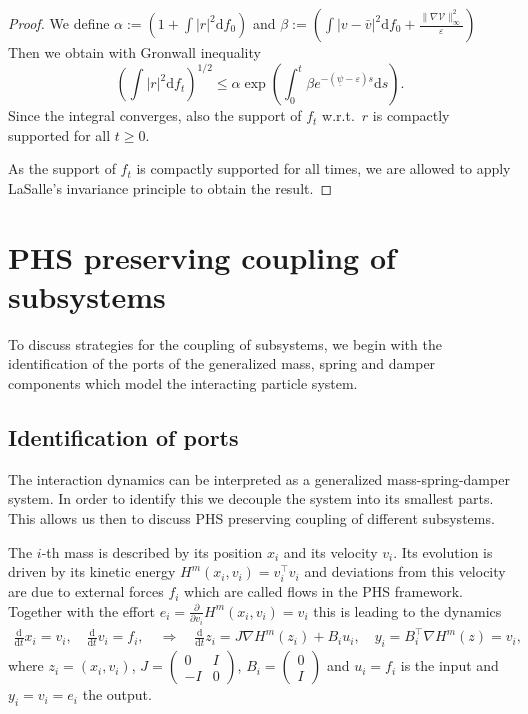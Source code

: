 \documentclass[11pt]{article}
\newcommand{\dd}[0]{\mathrm d}
\newcommand{\V}[0]{\mathcal V}
\begin{document}
\begin{bibunit}[abbrv]
\begin{proof}
We define $\alpha := (1+\int |r|^2 \dd f_0)$ and $\beta:=\left(\int |v-\bar v|^2 \dd f_0+\frac{\| \nabla \V \|_\infty^2}{\varepsilon} \right)$
Then we obtain with Gronwall inequality
\[
\left(\int |r|^2 \dd f_t\right)^{1/2} \le \alpha \exp( \int_0^t \beta e^{-(\underline{\psi} - \varepsilon)s }\dd s ).
\]
Since the integral converges, also the support of $f_t$ w.r.t.~$r$ is compactly supported for all $t\ge 0$. 

As the support of $f_t$ is compactly supported for all times, we are allowed to apply LaSalle's invariance principle to obtain the result.
\end{proof}


\section{PHS preserving coupling of subsystems}\label{sec:coupling}
To discuss strategies for the coupling of subsystems, we begin with the identification of the ports of the generalized mass, spring and damper components which model the interacting particle system. 


\subsection{Identification of ports}
The interaction dynamics can be interpreted as a generalized mass-spring-damper system. In order to identify this we decouple the system into its smallest parts. This allows us then to discuss PHS preserving coupling of different subsystems.

The $i$-th mass is described by its position $x_i$ and its velocity $v_i$. Its evolution is driven by its kinetic energy $H^m(x_i,v_i) = v_i^\top v_i$ and deviations from this velocity are due to external forces $f_i$ which are called flows in the PHS framework. Together with the effort $e_i = \frac{\partial}{\partial v_i} H^m(x_i,v_i) = v_i$ this is leading to the dynamics
\begin{align*}
\frac{\dd}{\dd t} x_i = v_i, \quad \frac{\dd}{\dd t} v_i =  f_i, \quad \Rightarrow \quad \frac{\dd}{\dd t} z_i = J \nabla H^m(z_i) + B_i u_i, \quad y_i = B_i^\top \nabla H^m(z) =  v_i,
\end{align*}
where $z_i=(x_i,v_i)$, $J = \left(\begin{smallmatrix}0 & I \\ -I & 0\end{smallmatrix}\right)$,  $B_i = \left(\begin{smallmatrix}0 \\ I\end{smallmatrix}\right)$  and $u_i =  f_i$ is the input and $y_i=v_i=e_i$ the output.



\end{bibunit}
\end{document}
